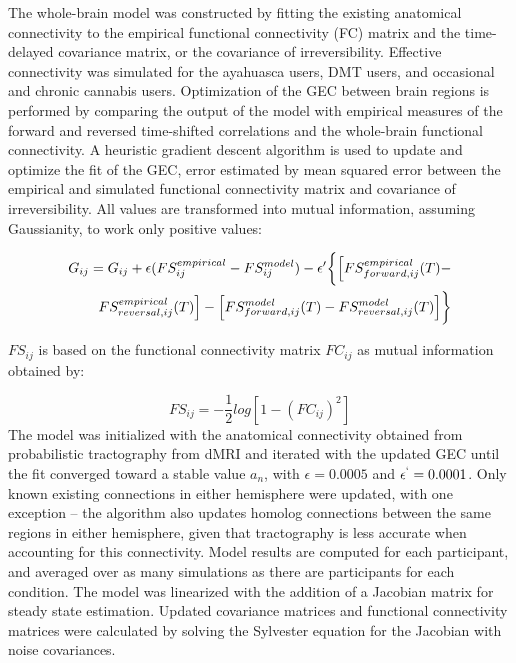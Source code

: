 The whole-brain model was constructed by fitting the existing anatomical
connectivity to the empirical functional connectivity (FC) matrix and
the time-delayed covariance matrix, or the covariance of
irreversibility. Effective connectivity was simulated for the ayahuasca
users, DMT users, and occasional and chronic cannabis users.
Optimization of the GEC between brain regions is performed by comparing
the output of the model with empirical measures of the forward and
reversed time-shifted correlations and the whole-brain functional
connectivity. A heuristic gradient descent algorithm is used to update
and optimize the fit of the GEC, error estimated by mean squared error
between the empirical and simulated functional connectivity matrix and
covariance of irreversibility. All values are transformed into mutual
information, assuming Gaussianity, to work only positive values:


\begin{equation}
    \begin{aligned}
        G_{ij} = G_{ij} + \epsilon(FS_{ij}^{empirical} - FS_{ij}^{model}) - \epsilon'\biggl\{ \Bigl[FS_{forward,ij}^{empirical}(T) - \\FS^{empirical}_{reversal,ij}(T)\Bigr] - \Bigl[FS_{forward,ij}^{model}(T) - FS^{model}_{reversal,ij}(T)\Bigr]\biggr\}
    \end{aligned}
\end{equation}




\(FS_{ij}\) is based on the functional connectivity matrix \(FC_{ij}\)
as mutual information obtained by:


\begin{equation}
FS_{ij}=-\frac{1}{2}log[1-(FC_{ij})^2]
\end{equation}
The model was initialized with the anatomical connectivity obtained
from probabilistic tractography from dMRI and iterated with the updated
GEC until the fit converged toward a stable value \(a_n\), with
\(\epsilon = 0.0005\) and \(\epsilon^`=0.0001\). Only known existing
connections in either hemisphere were updated, with one exception -- the
algorithm also updates homolog connections between the same regions in
either hemisphere, given that tractography is less accurate when
accounting for this connectivity. Model results are computed for each
participant, and averaged over as many simulations as there are
participants for each condition. The model was linearized with the
addition of a Jacobian matrix for steady state estimation. Updated
covariance matrices and functional connectivity matrices were calculated
by solving the Sylvester equation for the Jacobian with noise
covariances. 

